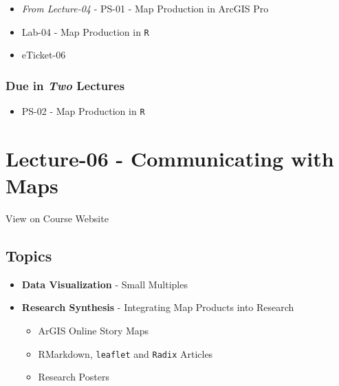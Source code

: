 \documentclass[]{book}
\providecommand{\tightlist}{%
  \setlength{\itemsep}{0pt}\setlength{\parskip}{0pt}}
\begin{document}
\begin{itemize}
\tightlist
\item
  \emph{From Lecture-04} - PS-01 - Map Production in ArcGIS Pro
\item
  Lab-04 - Map Production in \texttt{R}
\item
  eTicket-06
\end{itemize}

\hypertarget{due-in-two-lectures-1}{%
\subsubsection*{\texorpdfstring{Due in \emph{Two} Lectures}{Due in Two Lectures}}\label{due-in-two-lectures-1}}

\begin{itemize}
\tightlist
\item
  PS-02 - Map Production in \texttt{R}
\end{itemize}

\hypertarget{lecture-06---communicating-with-maps}{%
\section*{Lecture-06 - Communicating with Maps}\label{lecture-06---communicating-with-maps}}

View on Course Website

\hypertarget{topics-6}{%
\subsection*{Topics}\label{topics-6}}

\begin{itemize}
\tightlist
\item
  \textbf{Data Visualization} - Small Multiples
\item
  \textbf{Research Synthesis} - Integrating Map Products into Research

  \begin{itemize}
  \tightlist
  \item
    ArGIS Online Story Maps
  \item
    RMarkdown, \texttt{leaflet} and \texttt{Radix} Articles
  \item
    Research Posters
  \end{itemize}
\end{itemize}
\end{document}
